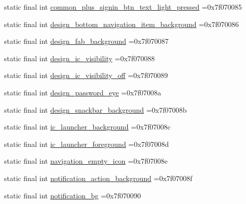 \begin{DoxyCompactItemize}
static final int \mbox{\hyperlink{classbr_1_1unb_1_1cic_1_1mp_1_1marketmaster_1_1R_1_1drawable_a9d9a727de5a7ad1a2bb4cd3a59b781e5}{common\+\_\+plus\+\_\+signin\+\_\+btn\+\_\+text\+\_\+light\+\_\+pressed}} =0x7f070085
\item 
static final int \mbox{\hyperlink{classbr_1_1unb_1_1cic_1_1mp_1_1marketmaster_1_1R_1_1drawable_a67f4dfb0aae2405384e7164e78086a4d}{design\+\_\+bottom\+\_\+navigation\+\_\+item\+\_\+background}} =0x7f070086
\item 
static final int \mbox{\hyperlink{classbr_1_1unb_1_1cic_1_1mp_1_1marketmaster_1_1R_1_1drawable_a2a700775a1d1968203fcaf662eae630b}{design\+\_\+fab\+\_\+background}} =0x7f070087
\item 
static final int \mbox{\hyperlink{classbr_1_1unb_1_1cic_1_1mp_1_1marketmaster_1_1R_1_1drawable_aa7a81dba5bb0d17d07bd3234491e72ef}{design\+\_\+ic\+\_\+visibility}} =0x7f070088
\item 
static final int \mbox{\hyperlink{classbr_1_1unb_1_1cic_1_1mp_1_1marketmaster_1_1R_1_1drawable_ab64d98dcc6aad784b9648610650ae79b}{design\+\_\+ic\+\_\+visibility\+\_\+off}} =0x7f070089
\item 
static final int \mbox{\hyperlink{classbr_1_1unb_1_1cic_1_1mp_1_1marketmaster_1_1R_1_1drawable_a97947c1e9641b78016e0bd8b512c0e8f}{design\+\_\+password\+\_\+eye}} =0x7f07008a
\item 
static final int \mbox{\hyperlink{classbr_1_1unb_1_1cic_1_1mp_1_1marketmaster_1_1R_1_1drawable_a3fe6c1d3c585e561c244f455f815c319}{design\+\_\+snackbar\+\_\+background}} =0x7f07008b
\item 
static final int \mbox{\hyperlink{classbr_1_1unb_1_1cic_1_1mp_1_1marketmaster_1_1R_1_1drawable_a8ec83cbece8f8f2a0dbabe6a783f7c69}{ic\+\_\+launcher\+\_\+background}} =0x7f07008c
\item 
static final int \mbox{\hyperlink{classbr_1_1unb_1_1cic_1_1mp_1_1marketmaster_1_1R_1_1drawable_a278d2775c8165137ad452f4d7a0dab75}{ic\+\_\+launcher\+\_\+foreground}} =0x7f07008d
\item 
static final int \mbox{\hyperlink{classbr_1_1unb_1_1cic_1_1mp_1_1marketmaster_1_1R_1_1drawable_a8d15a2f0da9eaf2a35dd16927df27f7d}{navigation\+\_\+empty\+\_\+icon}} =0x7f07008e
\item 
static final int \mbox{\hyperlink{classbr_1_1unb_1_1cic_1_1mp_1_1marketmaster_1_1R_1_1drawable_a5dcdb51aa78383304287371df2eef41b}{notification\+\_\+action\+\_\+background}} =0x7f07008f
\item 
static final int \mbox{\hyperlink{classbr_1_1unb_1_1cic_1_1mp_1_1marketmaster_1_1R_1_1drawable_a5f2b949a4d108481ab267ec6de99c832}{notification\+\_\+bg}} =0x7f070090

\end{DoxyCompactItemize}
